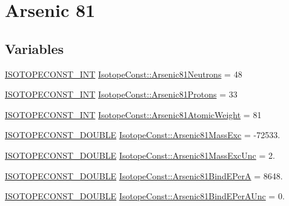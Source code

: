 \hypertarget{group___isotope_const-_arsenic-_as81}{}\section{Arsenic 81}
\label{group___isotope_const-_arsenic-_as81}
\subsection*{Variables}
\begin{DoxyCompactItemize}
\item 
\mbox{\hyperlink{group___isotope_const-_macros_ga5f18360b3e99483a35c32d789e62621c}{I\+S\+O\+T\+O\+P\+E\+C\+O\+N\+S\+T\+\_\+\+I\+NT}} \mbox{\hyperlink{group___isotope_const-_arsenic-_as81_ga17ca9dda7857f3316123dbb0758d078e}{Isotope\+Const\+::\+Arsenic81\+Neutrons}} = 48
\item 
\mbox{\hyperlink{group___isotope_const-_macros_ga5f18360b3e99483a35c32d789e62621c}{I\+S\+O\+T\+O\+P\+E\+C\+O\+N\+S\+T\+\_\+\+I\+NT}} \mbox{\hyperlink{group___isotope_const-_arsenic-_as81_ga564e95702e7b393dcaacde8fae7410c4}{Isotope\+Const\+::\+Arsenic81\+Protons}} = 33
\item 
\mbox{\hyperlink{group___isotope_const-_macros_ga5f18360b3e99483a35c32d789e62621c}{I\+S\+O\+T\+O\+P\+E\+C\+O\+N\+S\+T\+\_\+\+I\+NT}} \mbox{\hyperlink{group___isotope_const-_arsenic-_as81_ga27744341b5944926bc14763f09924a87}{Isotope\+Const\+::\+Arsenic81\+Atomic\+Weight}} = 81
\item 
\mbox{\hyperlink{group___isotope_const-_macros_ga8f45a7272ce02c0b4c65c44636ed719a}{I\+S\+O\+T\+O\+P\+E\+C\+O\+N\+S\+T\+\_\+\+D\+O\+U\+B\+LE}} \mbox{\hyperlink{group___isotope_const-_arsenic-_as81_gadb0ac1bd6c7d2a56df6c890e19cc5f3d}{Isotope\+Const\+::\+Arsenic81\+Mass\+Exc}} = -\/72533.
\item 
\mbox{\hyperlink{group___isotope_const-_macros_ga8f45a7272ce02c0b4c65c44636ed719a}{I\+S\+O\+T\+O\+P\+E\+C\+O\+N\+S\+T\+\_\+\+D\+O\+U\+B\+LE}} \mbox{\hyperlink{group___isotope_const-_arsenic-_as81_ga84d05e570efd7d21d4a19b871cb5d242}{Isotope\+Const\+::\+Arsenic81\+Mass\+Exc\+Unc}} = 2.
\item 
\mbox{\hyperlink{group___isotope_const-_macros_ga8f45a7272ce02c0b4c65c44636ed719a}{I\+S\+O\+T\+O\+P\+E\+C\+O\+N\+S\+T\+\_\+\+D\+O\+U\+B\+LE}} \mbox{\hyperlink{group___isotope_const-_arsenic-_as81_ga651e2cb0b9c682a7fa36304560335527}{Isotope\+Const\+::\+Arsenic81\+Bind\+E\+PerA}} = 8648.
\item 
\mbox{\hyperlink{group___isotope_const-_macros_ga8f45a7272ce02c0b4c65c44636ed719a}{I\+S\+O\+T\+O\+P\+E\+C\+O\+N\+S\+T\+\_\+\+D\+O\+U\+B\+LE}} \mbox{\hyperlink{group___isotope_const-_arsenic-_as81_ga6a62b1543ae4c263a955a0ff6426d0f8}{Isotope\+Const\+::\+Arsenic81\+Bind\+E\+Per\+A\+Unc}} = 0.

\end{DoxyCompactItemize}
